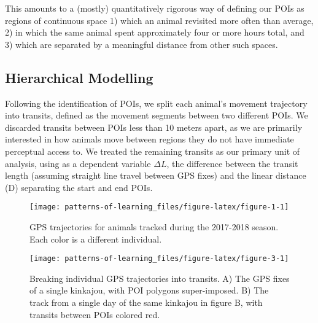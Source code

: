 \documentclass[twoside,12pt,final]{ucthesis-CA2012}
\begin{document}
\begin{ucmainmatter}
This amounts to a (mostly) quantitatively rigorous way of defining our POIs as regions of continuous space 1) which an animal revisited more often than average, 2) in which the same animal spent approximately four or more hours total, and 3) which are separated by a meaningful distance from other such spaces.

\hypertarget{hierarchical-modelling}{%
\subsection{Hierarchical Modelling}\label{hierarchical-modelling}}

Following the identification of POIs, we split each animal's movement trajectory into transits, defined as the movement segments between two different POIs. We discarded transits between POIs less than 10 meters apart, as we are primarily interested in how animals move between regions they do not have immediate perceptual access to. We treated the remaining transits as our primary unit of analysis, using as a dependent variable \(\Delta L\), the difference between the transit length (assuming straight line travel between GPS fixes) and the linear distance (D) separating the start and end POIs.
\begin{figure}
\texttt{[image: patterns-of-learning\_files/figure-latex/figure-1-1]} \caption[GPS Tracking Data]{GPS trajectories for animals tracked during the 2017-2018 season. Each color is a different individual.}\label{fig:figure-1}
\end{figure}
\begin{figure}
\texttt{[image: patterns-of-learning\_files/figure-latex/figure-3-1]} \caption[Telemetry data and segmentation methods]{Breaking individual GPS trajectories into transits. A) The GPS fixes of a single kinkajou, with POI polygons super-imposed. B) The track from a single day of the same kinkajou in figure B, with transits between POIs colored red.}\label{fig:figure-3}
\end{figure}

\end{ucmainmatter}
\end{document}
